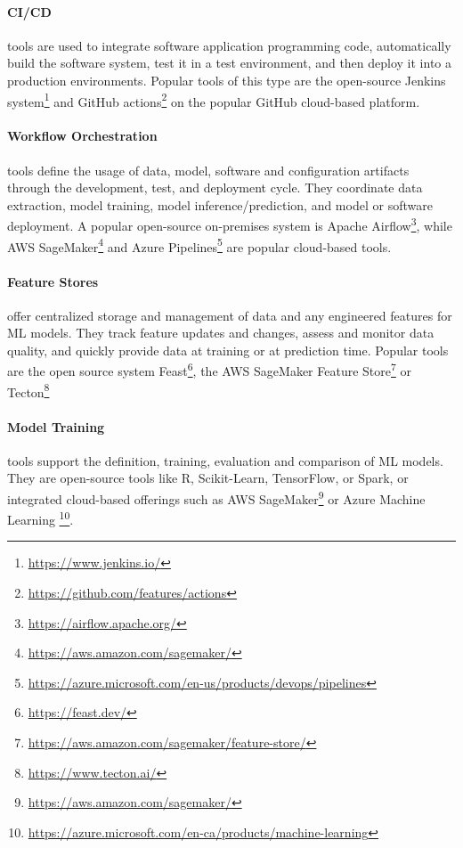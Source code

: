 \paragraph*{CI/CD} tools are used to integrate software application programming code, automatically build the software system, test it in a test environment, and then deploy it into a production environments. Popular tools of this type are the open-source Jenkins system\footnote{\url{https://www.jenkins.io/}} and GitHub actions\footnote{\url{https://github.com/features/actions}} on the popular GitHub cloud-based platform.

\paragraph*{Workflow Orchestration} tools define the usage of data, model, software and configuration artifacts through the development, test, and deployment cycle. They coordinate data extraction, model training, model inference/prediction, and model or software deployment. A popular open-source on-premises system is Apache Airflow\footnote{\url{https://airflow.apache.org/}}, while AWS SageMaker\footnote{\url{https://aws.amazon.com/sagemaker/}} and Azure Pipelines\footnote{\url{https://azure.microsoft.com/en-us/products/devops/pipelines}} are popular cloud-based tools. 

\paragraph*{Feature Stores} offer centralized storage and management of data and any engineered features for ML models. They track feature updates and changes, assess and monitor data quality, and quickly provide data at training or at prediction time. Popular tools are the open source system Feast\footnote{\url{https://feast.dev/}}, the AWS SageMaker Feature Store\footnote{\url{https://aws.amazon.com/sagemaker/feature-store/}} or Tecton\footnote{\url{https://www.tecton.ai/}}

\paragraph*{Model Training} tools support the definition, training, evaluation and comparison of ML models. They are open-source tools like R, Scikit-Learn, TensorFlow, or Spark, or integrated cloud-based offerings such as AWS SageMaker\footnote{\url{https://aws.amazon.com/sagemaker/}} or Azure Machine Learning \footnote{\url{https://azure.microsoft.com/en-ca/products/machine-learning}}. 

